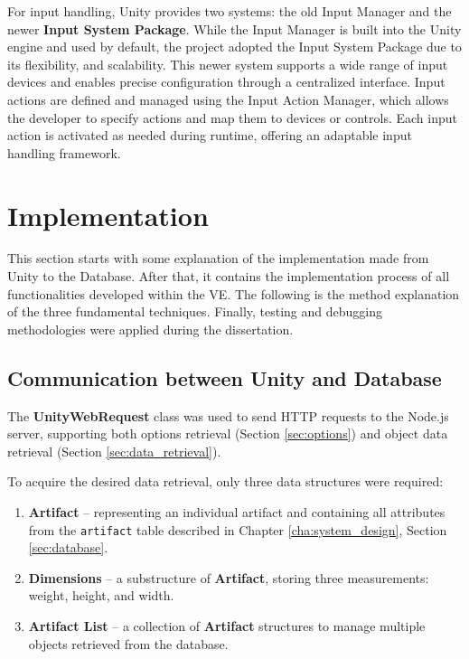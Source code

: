 For input handling, Unity provides two systems: the old Input Manager and the newer \textbf{Input System Package}. 
While the Input Manager is built into the Unity engine and used by default, the project adopted the Input System Package due to its flexibility, and scalability. 
This newer system supports a wide range of input devices and enables precise configuration through a centralized interface. Input actions are defined and managed using the Input Action Manager, which allows the developer to specify actions and map them to devices or controls. 
Each input action is activated as needed during runtime, offering an adaptable input handling framework.

\section{Implementation}
\label{sec:implementation}

This section starts with some explanation of the implementation made from Unity to the Database.
After that, it contains the implementation process of all functionalities developed within the \gls{VE}.
The following is the method explanation of the three fundamental techniques.
Finally, testing and debugging methodologies were applied during the dissertation.

\subsection{Communication between Unity and Database}
The \textbf{UnityWebRequest} class was used to send HTTP requests to the Node.js server, supporting both options retrieval (Section \ref{sec:options}) and object data retrieval (Section \ref{sec:data_retrieval}).

To acquire the desired data retrieval, only three data structures were required:  
\begin{enumerate}
    \item \textbf{Artifact} – representing an individual artifact and containing all attributes from the \texttt{artifact} table described in Chapter \ref{cha:system_design}, Section \ref{sec:database}.  
    \item \textbf{Dimensions} – a substructure of \textbf{Artifact}, storing three measurements: weight, height, and width.  
    \item \textbf{Artifact List} – a collection of \textbf{Artifact} structures to manage multiple objects retrieved from the database.  
\end{enumerate}

